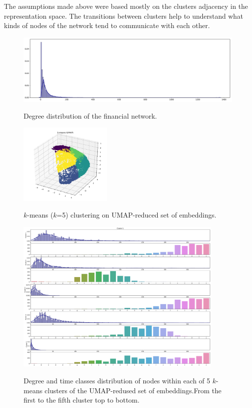 The assumptions made above were based mostly on the clusters adjacency in the representation space. The transitions between clusters help to understand what kinds of nodes of the network tend to communicate with each other.
\begin{figure}[!ht]
	\centering
	\includegraphics[width=1.0\textwidth]{images/appendix/App17.pdf}\\
	\caption{Degree distribution of the financial network.}
	\label{fig:App17}
\end{figure}
\begin{figure}[!ht]
	\centering
	\includegraphics[width=0.4\textwidth]{images/appendix/App19.pdf}\\
	\caption{$k$-means ($k$=5) clustering on UMAP-reduced set of embeddings.}
	\label{fig:App19}
\end{figure}
\begin{figure}[!ht]
	\centering
	\includegraphics[width=0.9\textwidth]{images/appendix/App18.pdf}\\
	\caption{Degree and time classes distribution of nodes within each of 5 $k$-means clusters of the UMAP-redused set of embeddings.From the first to the fifth cluster top to bottom.}
	\label{fig:App18}
\end{figure}

